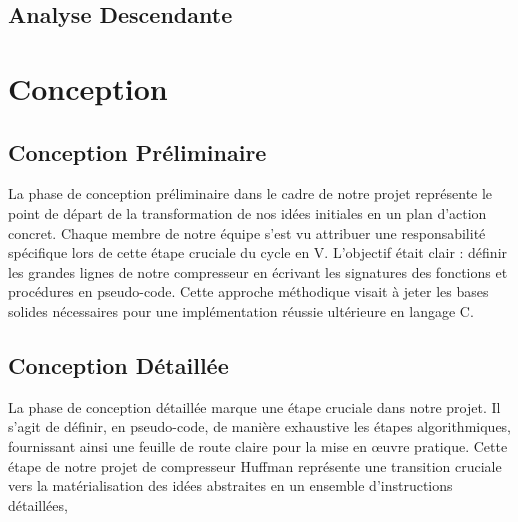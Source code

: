 \documentclass[12pt]{article}
\begin{document}
\subsection{Analyse Descendante}



\newpage
\section{Conception}

\subsection{Conception Préliminaire}
La phase de conception préliminaire dans le cadre de notre projet représente le point de départ de la transformation de nos idées initiales en un plan d'action concret. Chaque membre de notre équipe s'est vu attribuer une responsabilité spécifique lors de cette étape cruciale du cycle en V. L'objectif était clair : définir les grandes lignes de notre compresseur en écrivant les signatures des fonctions et procédures en pseudo-code. Cette approche méthodique visait à jeter les bases solides nécessaires pour une implémentation réussie ultérieure en langage C.\newline








\subsection{Conception Détaillée}
La phase de conception détaillée marque une étape cruciale dans notre projet. Il s'agit de définir, en pseudo-code, de manière exhaustive les étapes algorithmiques, fournissant ainsi une feuille de route claire pour la mise en œuvre pratique. Cette étape de notre projet de compresseur Huffman représente une transition cruciale vers la matérialisation des idées abstraites en un ensemble d'instructions détaillées, 








\end{document}
